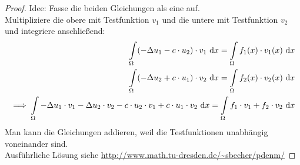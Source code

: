 \documentclass[12pt,a4paper]{article}
\begin{document}
\begin{proof}
Idee: Fasse die beiden Gleichungen als eine auf.\\
Multipliziere die obere mit Testfunktion $v_1$ und die untere mit Testfunktion $v_2$ und integriere anschließend:
\begin{align*}
\int\limits_\Omega(-\Delta u_1-c\cdot u_2)\cdot v_1\text{ d} x=\int\limits_\Omega f_1(x)\cdot v_1(x)\text{ d} x\\
\int\limits_\Omega(-\Delta u_2+c\cdot u_1)\cdot v_2\text{ d} x=\int\limits_\Omega f_2(x)\cdot v_2(x)\text{ d} x\\
\implies
\int\limits_\Omega -\Delta u_1\cdot v_1-\Delta u_2\cdot v_2-c\cdot u_2\cdot v_1+c\cdot u_1\cdot v_2\text{ d} x=\int\limits_\Omega f_1\cdot v_1+f_2\cdot v_2\text{ d} x
\end{align*}
Man kann die Gleichungen addieren, weil die Testfunktionen unabhängig voneinander sind.\\

Ausführliche Lösung siehe \url{http://www.math.tu-dresden.de/~sbecher/pdenm/}
\end{proof}
\end{document}
